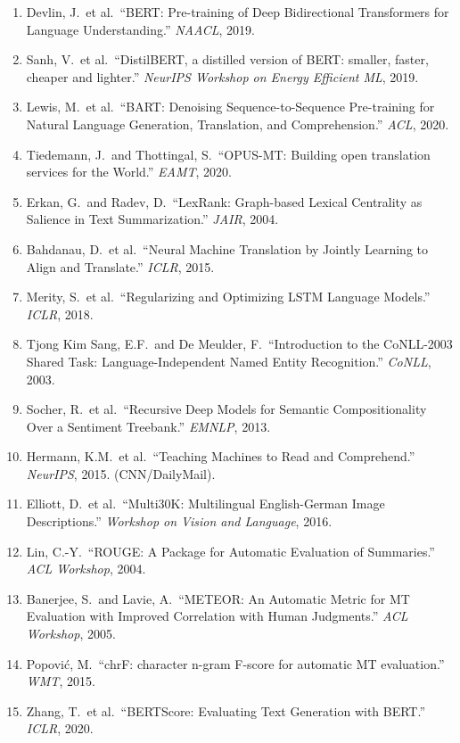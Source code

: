\documentclass[11pt,a4paper]{article}
\begin{document}
\small
\begin{enumerate}[noitemsep,leftmargin=1.4em]
    \item Devlin, J.\ et al.\ ``BERT: Pre-training of Deep Bidirectional Transformers for Language Understanding.'' \emph{NAACL}, 2019.
    \item Sanh, V.\ et al.\ ``DistilBERT, a distilled version of BERT: smaller, faster, cheaper and lighter.'' \emph{NeurIPS Workshop on Energy Efficient ML}, 2019.
    \item Lewis, M.\ et al.\ ``BART: Denoising Sequence-to-Sequence Pre-training for Natural Language Generation, Translation, and Comprehension.'' \emph{ACL}, 2020.
    \item Tiedemann, J.\ and Thottingal, S.\ ``OPUS-MT: Building open translation services for the World.'' \emph{EAMT}, 2020.
    \item Erkan, G.\ and Radev, D.\ ``LexRank: Graph-based Lexical Centrality as Salience in Text Summarization.'' \emph{JAIR}, 2004.
    \item Bahdanau, D.\ et al.\ ``Neural Machine Translation by Jointly Learning to Align and Translate.'' \emph{ICLR}, 2015.
    \item Merity, S.\ et al.\ ``Regularizing and Optimizing LSTM Language Models.'' \emph{ICLR}, 2018.
    \item Tjong Kim Sang, E.F.\ and De Meulder, F.\ ``Introduction to the CoNLL-2003 Shared Task: Language-Independent Named Entity Recognition.'' \emph{CoNLL}, 2003.
    \item Socher, R.\ et al.\ ``Recursive Deep Models for Semantic Compositionality Over a Sentiment Treebank.'' \emph{EMNLP}, 2013.
    \item Hermann, K.M.\ et al.\ ``Teaching Machines to Read and Comprehend.'' \emph{NeurIPS}, 2015. (CNN/DailyMail).
    \item Elliott, D.\ et al.\ ``Multi30K: Multilingual English-German Image Descriptions.'' \emph{Workshop on Vision and Language}, 2016.
    \item Lin, C.-Y.\ ``ROUGE: A Package for Automatic Evaluation of Summaries.'' \emph{ACL Workshop}, 2004.
    \item Banerjee, S.\ and Lavie, A.\ ``METEOR: An Automatic Metric for MT Evaluation with Improved Correlation with Human Judgments.'' \emph{ACL Workshop}, 2005.
    \item Popovi\'c, M.\ ``chrF: character n-gram F-score for automatic MT evaluation.'' \emph{WMT}, 2015.
    \item Zhang, T.\ et al.\ ``BERTScore: Evaluating Text Generation with BERT.'' \emph{ICLR}, 2020.
\end{enumerate}
\end{document}
